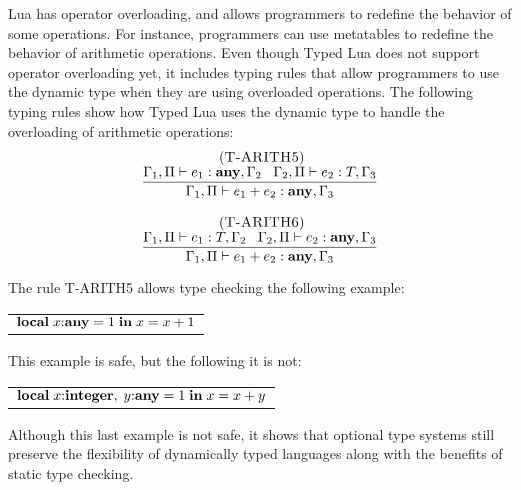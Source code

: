 Lua has operator overloading, and allows programmers to redefine
the behavior of some operations.
For instance, programmers can use metatables to redefine the
behavior of arithmetic operations.
Even though Typed Lua does not support operator overloading yet,
it includes typing rules that allow programmers to use the
dynamic type when they are using overloaded operations.
The following typing rules show how Typed Lua uses the dynamic type
to handle the overloading of arithmetic operations:
\[
\begin{array}{c}
\begin{array}{c}
\; (\textsc{T-ARITH5})\\
\dfrac{\Gamma_{1}, \Pi \vdash e_{1}:\mathbf{any}, \Gamma_{2} \;\;\;
       \Gamma_{2}, \Pi \vdash e_{2}:T, \Gamma_{3}}
      {\Gamma_{1}, \Pi \vdash e_{1} + e_{2}:\mathbf{any}, \Gamma_{3}}
\end{array}
\\ \\
\begin{array}{c}
\; (\textsc{T-ARITH6})\\
\dfrac{\Gamma_{1}, \Pi \vdash e_{1}:T, \Gamma_{2} \;\;\;
       \Gamma_{2}, \Pi \vdash e_{2}:\mathbf{any}, \Gamma_{3}}
      {\Gamma_{1}, \Pi \vdash e_{1} + e_{2}:\mathbf{any}, \Gamma_{3}}
\end{array}
\end{array}
\]

The rule \textsc{T-ARITH5} allows type checking the following
example:
\begin{center}
\begin{tabular}{l}
$\mathbf{local} \; x{:}\mathbf{any} = 1 \; \mathbf{in} \; x = x + 1$
\end{tabular}
\end{center}

This example is safe, but the following it is not:
\begin{center}
\begin{tabular}{l}
$\mathbf{local} \; x{:}\mathbf{integer}, \;y{:}\mathbf{any} = 1 \; \mathbf{in} \; x = x + y$
\end{tabular}
\end{center}

Although this last example is not safe, it shows that optional
type systems still preserve the flexibility of dynamically
typed languages along with the benefits of static type checking.

